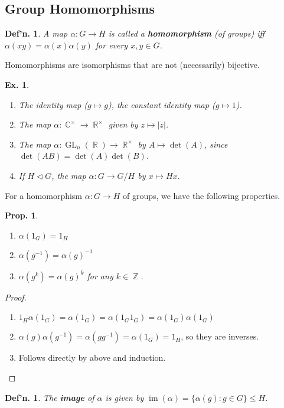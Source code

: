 \documentclass[12pt, a4paper]{book}
\DeclareMathOperator{\Z}{\mathbb{Z}}
\DeclareMathOperator{\R}{\mathbb{R}}
\DeclareMathOperator{\C}{\mathbb{C}}
\DeclareMathOperator{\GL}{GL}
\DeclareMathOperator{\im}{im}
\newtheorem{definition}[theorem]{Def'n.}
\newtheorem{proposition}[theorem]{Prop.}
\newtheorem{example}[theorem]{Ex.}
\theoremstyle{nonumberplain}
\newtheorem{proof}{Proof}
\begin{document}
\subsection{Group Homomorphisms}
\begin{definition}
    A map $\alpha:G\to H$ is called a \textbf{homomorphism} (of groups) iff $\alpha(xy)=\alpha(x)\alpha(y)$ for every $x,y\in G$.
\end{definition}
Homomorphisms are isomorphisms that are not (necessarily) bijective.
\begin{example}
    \begin{enumerate}
        \item The identity map ($g\mapsto g$), the constant identity map ($g\mapsto 1$).
        \item The map $\alpha:\C^\times\to\R^\times$ given by $z\mapsto|z|$.
        \item The map $\alpha:\GL_n(\R)\to\R^\times$ by $A\mapsto\det(A)$, since $\det(AB)=\det(A)\det(B)$.
        \item If $H\triangleleft G$, the map $\alpha:G\to G/H$ by $x\mapsto Hx$.
    \end{enumerate}
\end{example}
For a homomorphism $\alpha:G\to H$ of groups, we have the following properties.
\begin{proposition}
    \begin{enumerate}
        \item $\alpha(1_G)=1_H$
        \item $\alpha(g^{-1})=\alpha(g)^{-1}$
        \item $\alpha(g^k)=\alpha(g)^k$ for any $k\in\Z$.
    \end{enumerate}
\end{proposition}
\begin{proof}
    \begin{enumerate}
        \item $1_H\alpha(1_G)=\alpha(1_G)=\alpha(1_G1_G)=\alpha(1_G)\alpha(1_G)$
        \item $\alpha(g)\alpha(g^{-1})=\alpha(gg^{-1})=\alpha(1_G)=1_H$, so they are inverses.
        \item Follows directly by above and induction.
    \end{enumerate}
\end{proof}
\begin{definition}
    The \textbf{image} of $\alpha$ is given by $\im(\alpha)=\{\alpha(g):g\in G\}\leq H$.
\end{definition}
\end{document}
